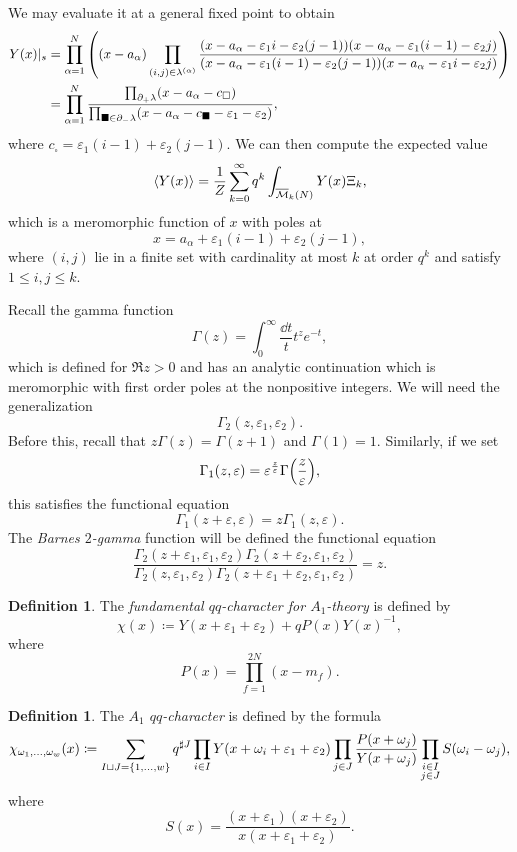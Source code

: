 \documentclass[leqno, openany]{memoir}
\theoremstyle{definition}
\newtheorem{defn}[thm]{Definition}
\theoremstyle{remark}
\theoremstyle{plain}
\theoremstyle{definition}
\theoremstyle{remark}
\newcommand{\ep}{\varepsilon}
\newcommand{\mc}[1]{\mathcal{#1}}
\newcommand{\ol}[1]{\overline{#1}}
\begin{document}
We may evaluate it at a general fixed point to obtain
\begin{align*}
    Y(x)|_s &= \prod_{\alpha=1}^N \qty((x-a_{\alpha}) \prod_{(i,j) \in \lambda^{(\alpha)}} \frac{(x-a_{\alpha}-\ep_1 i - \ep_2(j-1))(x-a_{\alpha} - \ep_1(i-1) - \ep_2 j)}{(x-a_{\alpha}-\ep_1(i-1) - \ep_2(j-1))(x-a_{\alpha}-\ep_1 i - \ep_2 j)}) \\
    &= \prod_{\alpha=1}^N \frac{\prod_{\box \in \partial_+ \lambda} (x-a_{\alpha} - c_{\square})}{\prod_{\blacksquare \in \partial_- \lambda} (x-a_{\alpha} - c_{\blacksquare} - \ep_1 - \ep_2)},
\end{align*}
where $c_{\square} = \ep_1(i-1) + \ep_2(j-1)$. We can then compute the expected value
\[ \ev{Y(x)} = \frac{1}{Z} \sum_{k=0}^{\infty} q^k \int_{\ol{\mc{M}}_k(N)} Y(x) \Xi_k, \]
which is a meromorphic function of $x$ with poles at
\[ x= a_{\alpha} + \ep_1(i-1) + \ep_2(j-1), \]
where $(i, j)$ lie in a finite set with cardinality at most $k$ at order $q^k$ and satisfy $1 \leq i, j \leq k$.

Recall the gamma function
\[ \Gamma(z) = \int_0^{\infty} \frac{\dd t}{t} t^z e^{-t}, \]
which is defined for $\Re z > 0$ and has an analytic continuation which is meromorphic with first order poles at the nonpositive integers. We will need the generalization
\[ \Gamma_2(z, \ep_1, \ep_2). \]
Before this, recall that $z \Gamma(z) = \Gamma(z+1)$ and $\Gamma(1) = 1$. Similarly, if we set
\[ \Gamma_1(z, \ep) = \ep^{\frac{z}{\ep}} \Gamma\qty(\frac{z}{\ep}), \]
this satisfies the functional equation
\[ \Gamma_1(z+\ep, \ep) = z \Gamma_1(z, \ep). \]
The \textit{Barnes $2$-gamma} function will be defined the functional equation
\[ \frac{\Gamma_2(z+\ep_1, \ep_1, \ep_2)\Gamma_2(z+\ep_2, \ep_1, \ep_2)}{\Gamma_2(z, \ep_1, \ep_2) \Gamma_2(z+\ep_1+\ep_2, \ep_1, \ep_2)} = z. \]

\begin{defn}
    The \textit{fundamental $qq$-character for $A_1$-theory} is defined by
    \[ \chi(x) \coloneqq Y(x+\ep_1 + \ep_2) + q P(x) Y(x)^{-1}, \]
    where
    \[ P(x) = \prod_{f=1}^{2N}(x-m_f). \]
\end{defn}

\begin{defn}
    The \textit{$A_1$ $qq$-character} is defined by the formula
    \[ \chi_{\omega_1, \ldots, \omega_w}(x) \coloneqq \sum_{I \sqcup J = \qty{1,\ldots,w}} q^{\sharp J} \prod_{i \in I} Y(x + \omega_i + \ep_1 + \ep_2) \prod_{j \in J} \frac{P(x+\omega_j)}{Y(x+\omega_j)} \prod_{\substack{i \in I \\ j \in J}} S(\omega_i - \omega_j), \]
    where
    \[ S(x) = \frac{(x+\ep_1)(x+\ep_2)}{x(x+\ep_1+\ep_2)}. \]
\end{defn}
\end{document}
